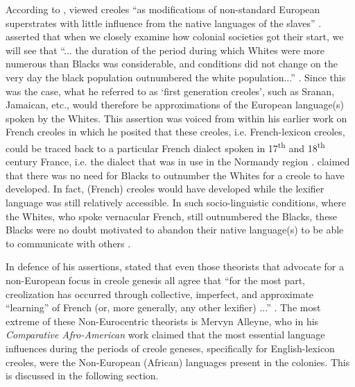 According to  \citet{Braun09},  \citet{Chaudenson92} viewed creoles ``as modifications of non-standard European superstrates with little influence from the native languages of the slaves'' \citep[3]{Braun09}. \citet{Chaudenson92} asserted that when we closely examine how colonial societies got their start, we will see that ``... the duration of the period during which Whites were more numerous than Blacks was considerable, and conditions did not change on the very day the black population outnumbered the white population...'' \citep[60]{Chaudenson92}. Since this was the case, what he referred to as `first generation creoles', such as Sranan, Jamaican, etc., would therefore be approximations of the European language(s) spoken by the Whites. This assertion was voiced from within his earlier work on French creoles in which he posited that these creoles, i.e. French-lexicon creoles, could be traced back to a particular French dialect spoken in 17\textsuperscript{th} and 18\textsuperscript{th} century France, i.e. the dialect that was in use in the Normandy region \citep{Chaudenson79}.  \citet{Chaudenson79} claimed that there was no need for Blacks to outnumber the Whites for a creole to have developed. In fact, (French) creoles would have developed while the lexifier language was still relatively accessible. In such socio-linguistic conditions, where the Whites, who spoke vernacular French, still outnumbered the Blacks, these Blacks were no doubt motivated to abandon their native language(s) to be able to communicate with others \citep{Chaudenson79}.

In defence of his assertions,  \citet{Chaudenson01} stated that even those theorists that advocate for a non-European focus in creole genesis all agree that ``for the most part, creolization has occurred through collective, imperfect, and approximate ``learning'' of French (or, more generally, any other lexifier) ...'' \citep{Chaudenson01}. The most extreme of these Non-Eurocentric theorists is Mervyn Alleyne, who in his \emph{Comparative Afro-American} work \citep{Alleyne80} claimed that the most essential language influences during the periods of creole geneses, specifically for English-lexicon creoles, were the Non-European (African) languages present in the colonies. This is discussed in the following section.

